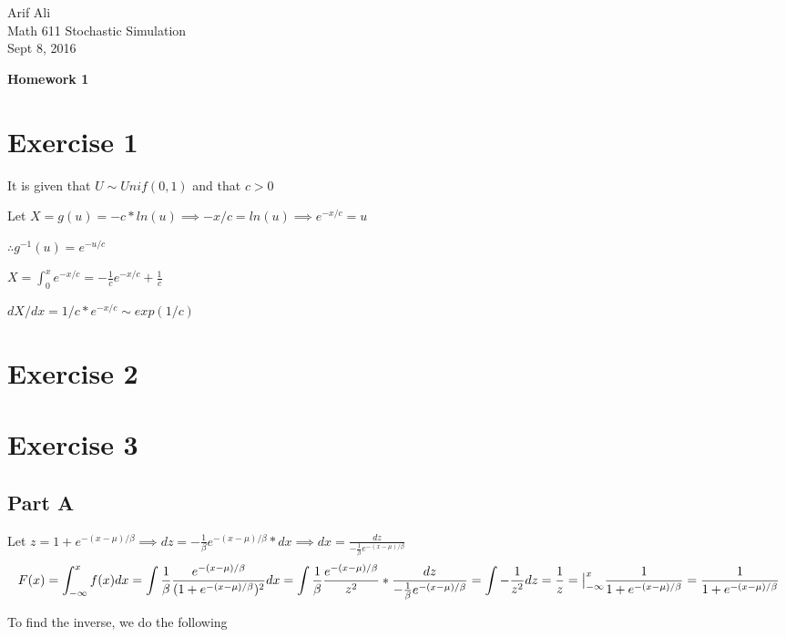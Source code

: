 \documentclass{article}\usepackage[]{graphicx}\usepackage[]{color}
\begin{document}
\begin{flushright}
Arif Ali\\
Math 611 Stochastic Simulation\\
Sept 8, 2016\\
\end{flushright}

\begin{center}
\LARGE\textbf{Homework 1}
  \end{center}
\section*{Exercise 1}
It is given that $U \sim Unif(0,1)$ and that $c>0$

Let $X = g(u) = -c*ln(u) \implies -x/c=ln(u) \implies e^{-x/c}=u$

$\therefore g^{-1}(u) = e^{-u/c}$

$X = \int^{x}_{0}e^{-x/c}=-\frac{1}{c}e^{-x/c}+\frac{1}{c}$

$dX/dx = 1/c*e^{-x/c} \sim exp(1/c)$

\section*{Exercise 2}

\section*{Exercise 3}
\subsection*{Part A}

Let $z = 1+e^{-(x-\mu)/\beta} \implies dz = -\frac{1}{\beta}e^{-(x-\mu)/\beta}*dx \implies dx = \frac{dz}{-\frac{1}{\beta}e^{-(x-\mu)/\beta}}$
\begin{equation}
F(x) = \int^{x}_{-\infty} f(x) dx = \int\frac{1}{\beta}\frac{e^{-(x-\mu)/\beta}}{(1+e^{-(x-\mu)/\beta})^2}dx=
\int\frac{1}{\beta}\frac{e^{-(x-\mu)/\beta}}{z^2}*\frac{dz}{-\frac{1}{\beta}e^{-(x-\mu)/\beta}}=
\int-\frac{1}{z^2}dz=\\
\frac{1}{z}=\big|^{x}_{-\infty}\frac{1}{1+e^{-(x-\mu)/\beta}}=\frac{1}{1+e^{-(x-\mu)/\beta}}
\end{equation}

To find the inverse, we do the following
\end{document}
